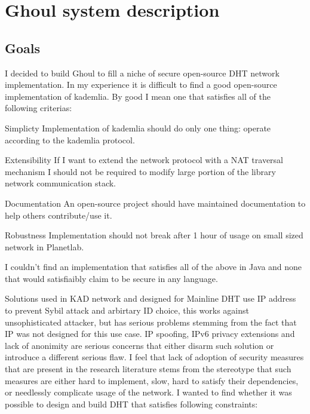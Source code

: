 \chapter{Ghoul system description}
\section{Goals}
I decided to build Ghoul to fill a niche of secure open-source DHT network
implementation. In my experience it is difficult to find a good open-source
implementation of kademlia. By good I mean one that satisfies all of the
following criterias:

\begin{description}
  \item{Simplicty} Implementation of kademlia should do only one thing: operate
    according to the kademlia protocol.
  \item{Extensibility} If I want to extend the network protocol with a NAT
    traversal mechanism I should not be required to modify large portion of the
    library network communication stack.
  \item{Documentation} An open-source project should have maintained
    documentation to help others contribute/use it.
  \item{Robustness} Implementation should not break after 1 hour of usage on
    small sized network in Planetlab.
\end{description}

I couldn't find an implementation that satisfies all of the above in Java and
none that would satisfiaibly claim to be secure in any language.

Solutions used in KAD network and designed for Mainline DHT use IP address to
prevent Sybil attack and arbirtary ID choice, this works against unsophisticated
attacker, but has serious problems stemming from the fact that IP was not
designed for this use case. IP spoofing, IPv6 privacy extensions and lack of
anonimity are serious concerns that either disarm such solution or introduce a
different serious flaw. I feel that lack of adoption of security measures
that are present in the research literature stems from the stereotype that such
measures are either hard to implement, slow, hard to satisfy their dependencies,
or needlessly complicate usage of the network. I wanted to find whether it was
possible to design and build DHT that satisfies following constraints:

